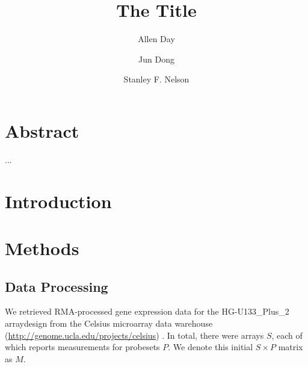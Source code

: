\documentclass{article}
\begin{document}
\title{The Title}
\author{
Allen Day \and Jun Dong \and Stanley F. Nelson
}
\maketitle

\section{Abstract}\label{Abstract}
...

\section{Introduction}
\label{Hypothesis}

\section{Methods}\label{Methods}


\subsection{Data Processing}\label{Processing}
We retrieved RMA-processed gene expression data for the HG-U133\_Plus\_2
arraydesign from the Celsius microarray data warehouse
(\url{http://genome.ucla.edu/projects/celsius}) \cite{rma,celsius}.  In total,
there were  arrays $S$, each of which reports measurements for 
probesets $P$.  We denote this initial $S{\times}P$ matrix as $M$.
\end{document}
